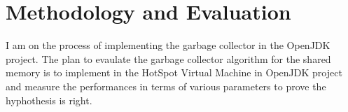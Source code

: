 \section{Methodology and Evaluation}
I am on the process of implementing the garbage collector in the OpenJDK project. The plan to evaulate the garbage collector algorithm for the shared memory is to implement in the HotSpot Virtual Machine in OpenJDK project and measure the performances in terms of various parameters to prove the hyphothesis is right. 
